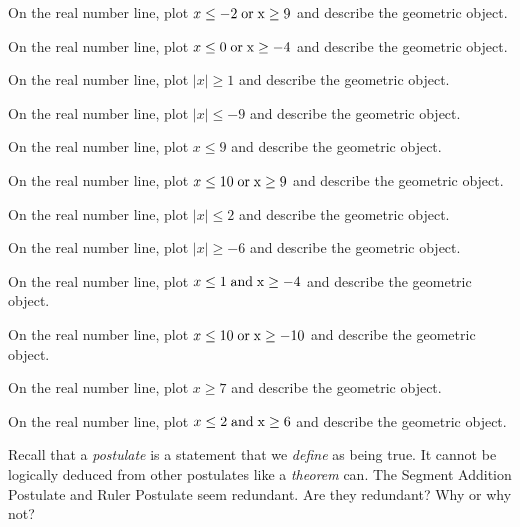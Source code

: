 \documentclass[12pt]{article}
\newenvironment{problem}[2][Problem]{\begin{trivlist}
			\item[\hskip \labelsep {\bfseries #1}\hskip \labelsep {\bfseries #2.}]}{\end{trivlist}}
\begin{document}
			\begin{problem}{0} 
On the real number line, plot $ x \leq -2 \;\rm{ or }\; x \geq 9$ and describe the geometric object.
 \end{problem}\begin{problem}{1} 
On the real number line, plot $ x \leq 0 \;\rm{ or }\; x \geq -4$ and describe the geometric object.
 \end{problem}\begin{problem}{2} 
On the real number line, plot $\mid x\mid \geq 1$ and describe the geometric object.
 \end{problem}\begin{problem}{3} 
On the real number line, plot $\mid x\mid \leq -9$ and describe the geometric object.
 \end{problem}\begin{problem}{4} 
On the real number line, plot $x \leq 9$ and describe the geometric object.
 \end{problem}\begin{problem}{5} 
On the real number line, plot $ x \leq 10 \;\rm{ or }\; x \geq 9$ and describe the geometric object.
 \end{problem}\begin{problem}{6} 
On the real number line, plot $\mid x\mid \leq 2$ and describe the geometric object.
 \end{problem}\begin{problem}{7} 
On the real number line, plot $\mid x\mid \geq -6$ and describe the geometric object.
 \end{problem}\begin{problem}{8} 
On the real number line, plot $ x \leq 1 \;\rm{ and }\; x \geq -4$ and describe the geometric object.
 \end{problem}\begin{problem}{9} 
On the real number line, plot $ x \leq 10 \;\rm{ or }\; x \geq -10$ and describe the geometric object.
 \end{problem}\begin{problem}{10} 
On the real number line, plot $x \geq 7$ and describe the geometric object.
 \end{problem}\begin{problem}{11} 
On the real number line, plot $ x \leq 2 \;\rm{ and }\; x \geq 6$ and describe the geometric object.
 \end{problem}\begin{problem}{Challenge} 

	Recall that a \textit{postulate} is a statement that we \textit{define} as being true. It cannot
	be logically deduced from other postulates like a \textit{theorem} can.
	The Segment Addition Postulate and Ruler Postulate seem redundant. Are they redundant? Why or why not?
	
 \end{problem}
\end{document}
